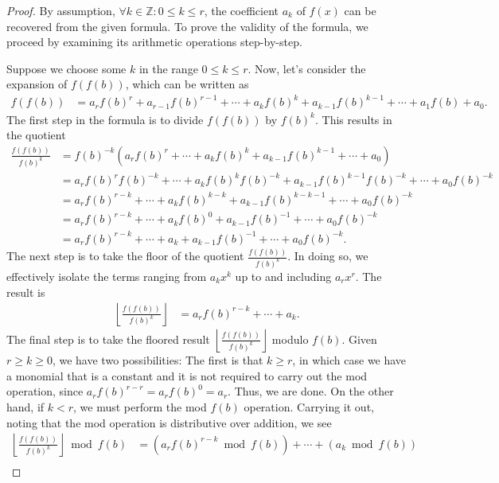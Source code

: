 \documentclass{article}
\theoremstyle{plain}
\newcommand{\floor}[1]{\left\lfloor #1 \right\rfloor}
\begin{document}
\begin{proof}
By assumption, $\forall k \in \mathbb{Z} : 0 \leq k \leq r$, the coefficient $a_k$ of $f(x)$ can be recovered from the given formula. To prove the validity of the formula, we proceed by examining its arithmetic operations step-by-step.

Suppose we choose some $k$ in the range $0 \leq k \leq r$. Now, let's consider the expansion of $f(f(b))$, which can be written as
\begin{align*}
f(f(b)) &= a_r f(b)^r + a_{r-1} f(b)^{r-1} + \cdots + a_{k} f(b)^{k} + a_{k-1} f(b)^{k-1} + \cdots + a_1 f(b) + a_0 .
\end{align*}
The first step in the formula is to divide $f(f(b))$ by $f(b)^{k}$. This results in the quotient
\begin{align*}
\frac{f(f(b))}{f(b)^k} &= f(b)^{-k} (a_r f(b)^r  + \cdots + a_{k} f(b)^{k} + a_{k-1} f(b)^{k-1} + \cdots + a_0) \\
&= a_r f(b)^r f(b)^{-k} + \cdots + a_{k} f(b)^{k} f(b)^{-k} + a_{k-1} f(b)^{k-1} f(b)^{-k} + \cdots + a_0 f(b)^{-k} \\
&= a_r f(b)^{r-k} + \cdots + a_{k} f(b)^{k-k} + a_{k-1} f(b)^{k-k-1} + \cdots + a_0 f(b)^{-k}  \\
&= a_r f(b)^{r-k} + \cdots + a_{k} f(b)^{0} + a_{k-1} f(b)^{-1} + \cdots + a_0 f(b)^{-k}  \\
&= a_r f(b)^{r-k} + \cdots + a_{k} + a_{k-1} f(b)^{-1} + \cdots + a_0 f(b)^{-k} .
\end{align*}
The next step is to take the floor of the quotient $\frac{f(f(b))}{f(b)^k}$. In doing so, we effectively isolate the terms ranging from $a_k x^k$ up to and including $a_r x^r$. The result is
\begin{align*}
\floor{\frac{f(f(b))}{f(b)^k}} &= a_r f(b)^{r-k} + \cdots + a_{k} .
\end{align*}
The final step is to take the floored result $\floor{\frac{f(f(b))}{f(b)^k}}$ modulo $f(b)$. Given $r \geq k \geq 0$, we have two possibilities: The first is that $k \geq r$, in which case we have a monomial that is a constant and it is not required to carry out the mod operation, since $a_r f(b)^{r-r} = a_r f(b)^{0} = a_r$. Thus, we are done. On the other hand, if $k < r$, we must perform the mod $f(b)$ operation. Carrying it out, noting that the mod operation is distributive over addition, we see
\begin{align*}
\floor{\frac{f(f(b))}{f(b)^{k}}} \bmod{f(b)} &= (a_r f(b)^{r-k} \bmod{f(b)}) + \cdots + (a_{k} \bmod{f(b)}) \\

\end{align*}
\end{proof}
\end{document}
